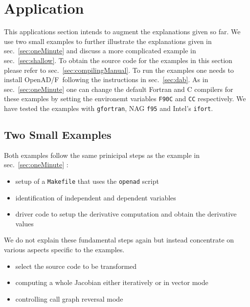 \documentclass{book}
\newcommand{\OpenADF}{OpenAD/F}
\newcommand{\refsec}[1]{{sec.~\ref{#1}}}
\begin{document}
\chapter{Application}\label{sec:application}
This applications section intends to augment the explanations given so far. 
We use two small examples to further illustrate the  explanations given in \refsec{sec:oneMinute} and 
discuss a more complicated example in \refsec{sec:shallow}. 
To obtain the source code for the examples in this section please refer to \refsec{sec:compilingManual}. 
To run the examples one needs to install \OpenADF\ following the instructions in \refsec{sec:dab}.
As in 
\refsec{sec:oneMinute}
one can change the default Fortran  and C compilers for these examples by setting the
environemt variables \lstinline{F90C} and \lstinline{CC} respectively. 
We have tested the examples with \lstinline{gfortran}, NAG \lstinline{f95} and Intel's \lstinline{ifort}.  
\section{Two Small Examples}\label{sec:toyExample}
Both examples follow the same prinicipal steps as the example in \refsec{sec:oneMinute} :
\begin{itemize}
\item setup of a \lstinline{Makefile} that uses the \lstinline{openad} script
\item identification of independent and dependent variables
\item driver code to setup the derivative computation and obtain the derivative values
\end{itemize}
We do not explain these fundamental steps again but instead concentrate on various aspects 
specific to the examples. 
\begin{itemize}
\item select the source code to be transformed
\item computing a whole Jacobian either iteratively or in vector mode
\item controlling call graph reversal mode
\end{itemize}
\end{document}
